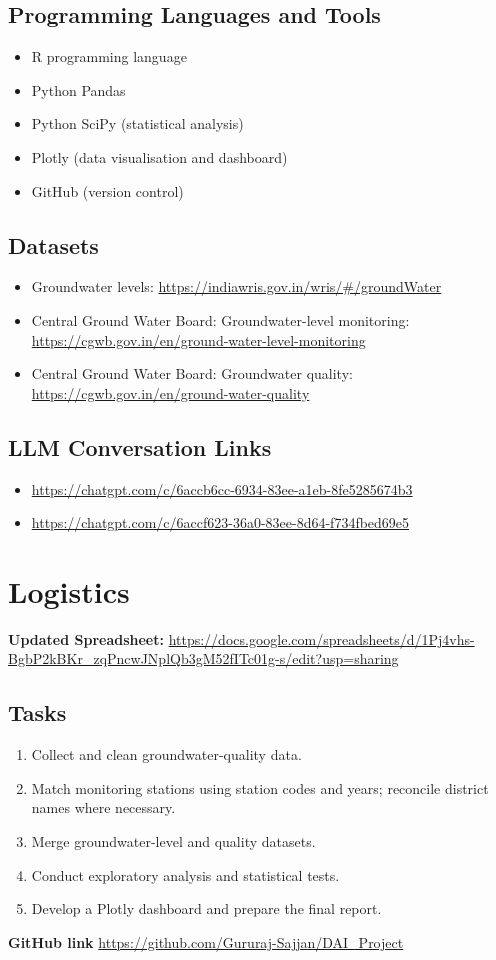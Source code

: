 \documentclass[12pt]{article}
\begin{document}
\subsection{Programming Languages and Tools}
\begin{itemize}
    \item R programming language
    \item Python Pandas
    \item Python SciPy (statistical analysis)
    \item Plotly (data visualisation and dashboard)
    \item GitHub (version control)
\end{itemize}
\subsection{Datasets}
\begin{itemize}
    \item Groundwater levels:
    \url{https://indiawris.gov.in/wris/#/groundWater}
    \item Central Ground Water Board: Groundwater-level monitoring:
    \url{https://cgwb.gov.in/en/ground-water-level-monitoring}
    \item Central Ground Water Board: Groundwater quality:
    \url{https://cgwb.gov.in/en/ground-water-quality}
\end{itemize}
\subsection{LLM Conversation Links}
\begin{itemize}
    \item \url{https://chatgpt.com/c/6accb6cc-6934-83ee-a1eb-8fe5285674b3}
    \item \url{https://chatgpt.com/c/6accf623-36a0-83ee-8d64-f734fbed69e5}
\end{itemize}
\section{Logistics}
\textbf{Updated Spreadsheet:}
\url{https://docs.google.com/spreadsheets/d/1Pj4vhs-BgbP2kBKr_zqPncwJNplQb3gM52fITc01g-s/edit?usp=sharing}
\subsection{Tasks}
\begin{enumerate}
    \item Collect and clean groundwater-quality data.
    \item Match monitoring stations using station codes and years; reconcile district names where necessary.
    \item Merge groundwater-level and quality datasets.
    \item Conduct exploratory analysis and statistical tests.
    \item Develop a Plotly dashboard and prepare the final report.
\end{enumerate}
\textbf{GitHub link}
\url{https://github.com/Gururaj-Sajjan/DAI_Project}
\end{document}
